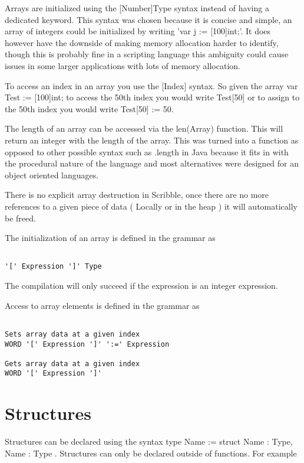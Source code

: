 \documentclass[]{final_report}
\begin{document}
Arrays are initialized using the [Number]Type syntax instead of having a dedicated keyword. This syntax was chosen because it is concise and simple, an array of integers could be initialized by writing 'var j := [100]int;'. It does however have the downside of making memory allocation harder to identify, though this is probably fine in a scripting language this ambiguity could cause issues in some larger applications with lots of memory allocation.

To access an index in an array you use the [Index] syntax. So given the array var Test := [100]int; to access the 50th index you would write Test[50] or to assign to the 50th index you would write Test[50] := 50.

The length of an array can be accessed via the len(Array) function. This will return an integer with the length of the array. This was turned into a function as opposed to other possible syntax such as .length in Java because it fits in with the procedural nature of the language and most alternatives were designed for an object oriented languages.

There is no explicit array destruction in Scribble, once there are no more references to a given piece of data ( Locally or in the heap ) it will automatically be freed.

The initialization of an array is defined in the grammar as
\begin{verbatim}

'[' Expression ']' Type

\end{verbatim}

The compilation will only succeed if the expression is an integer expression.

Access to array elements is defined in the grammar as
\begin{verbatim}

Sets array data at a given index
WORD '[' Expression ']' ':=' Expression

Gets array data at a given index
WORD '[' Expression ']'

\end{verbatim}

\section{Structures}

Structures can be declared using the syntax type Name := struct { Name : Type, Name : Type }. Structures can only be declared outside of functions. For example
\end{document}
